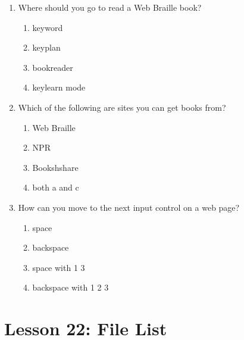 \documentclass[10pt,letterpaper,twoside]{report}
\begin{document}
{{{{\begin{enumerate}
\begin{enumerate}
		      \item p
		            
		            
	      \end{enumerate}
	\item Where should you go to read a Web Braille book?
	      
	      \begin{enumerate}
		      \item keyword
		            
		      \item keyplan
		            
		      \item bookreader
		            
		      \item keylearn mode
		            
		            
	      \end{enumerate}
	\item Which of the following are sites you can get books from?
	      
	      \begin{enumerate}
		      \item Web Braille
		            
		      \item NPR
		            
		      \item Bookshshare
		            
		      \item both a and c
		            
		            
	      \end{enumerate}
	\item How can you move to the next input control on a web page?
	      
	      \begin{enumerate}
		      \item space
		            
		      \item backspace
		            
		      \item space with 1 3
		            
		      \item backspace with 1 2 3
	      \end{enumerate}
\end{enumerate}

\section*{Lesson 22: File List}


}}}}
\end{document}
